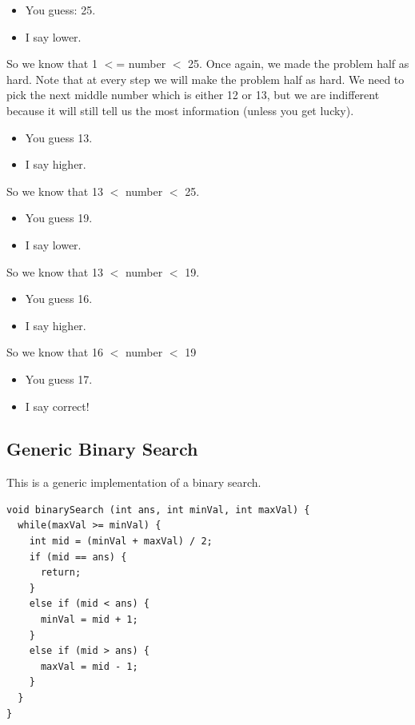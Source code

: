 \documentclass[11pt,oneside]{book}
\begin{document}
\begin{itemize}
\item You guess: 25.
\item I say lower.
\end{itemize}

So we know that 1 $<$= number $<$ 25. Once again, we made the problem half as hard. Note that at every step we will make the problem half as hard. We need to pick the next middle number which is either 12 or 13, but we are indifferent because it will still tell us the most information (unless you get lucky).

\begin{itemize}
\item You guess 13.
\item I say higher.
\end{itemize}

So we know that 13 $<$ number $<$ 25.

\begin{itemize}
\item You guess 19.
\item I say lower.
\end{itemize}

So we know that 13 $<$ number $<$ 19.

\begin{itemize}
\item You guess 16.
\item I say higher.
\end{itemize}

So we know that 16 $<$ number $<$ 19

\begin{itemize}
\item You guess 17.
\item I say correct!
\end{itemize}

\subsection{Generic Binary Search}

This is a generic implementation of a binary search.

\begin{lstlisting}
void binarySearch (int ans, int minVal, int maxVal) {
  while(maxVal >= minVal) {
    int mid = (minVal + maxVal) / 2;
    if (mid == ans) {
      return;
    }
    else if (mid < ans) {
      minVal = mid + 1;
    } 
    else if (mid > ans) {
      maxVal = mid - 1;
    }
  }
}
\end{lstlisting}
\end{document}
